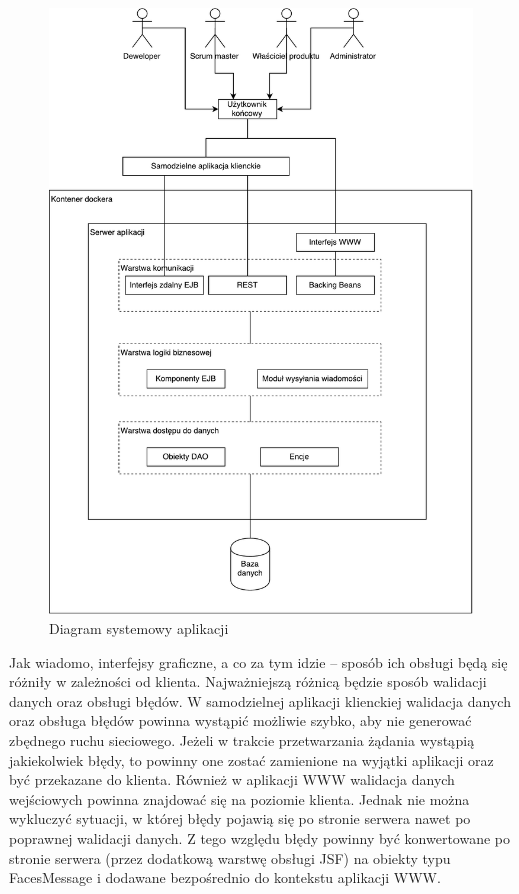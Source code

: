 \begin{figure}[h!]
	\centering
	\includegraphics[width=13.5cm]{rysunki/diagsys.pdf}	
	\caption{Diagram systemowy aplikacji}
	\label{fig:diagsys}
\end{figure}

Jak wiadomo, interfejsy graficzne, a co za tym idzie – sposób ich obsługi będą się różniły w zależności od klienta. Najważniejszą różnicą będzie sposób walidacji danych oraz obsługi błędów. W samodzielnej aplikacji klienckiej walidacja danych oraz obsługa błędów powinna wystąpić możliwie szybko, aby nie generować zbędnego ruchu sieciowego. Jeżeli w trakcie przetwarzania żądania wystąpią jakiekolwiek błędy, to powinny one zostać zamienione na wyjątki aplikacji oraz być przekazane do klienta. Również w aplikacji WWW walidacja danych wejściowych powinna znajdować się na poziomie klienta. Jednak nie można wykluczyć sytuacji, w której błędy pojawią się po stronie serwera nawet po poprawnej walidacji danych. Z tego względu błędy powinny być konwertowane po stronie serwera (przez dodatkową warstwę obsługi JSF) na obiekty typu FacesMessage i dodawane bezpośrednio do kontekstu aplikacji WWW. 

